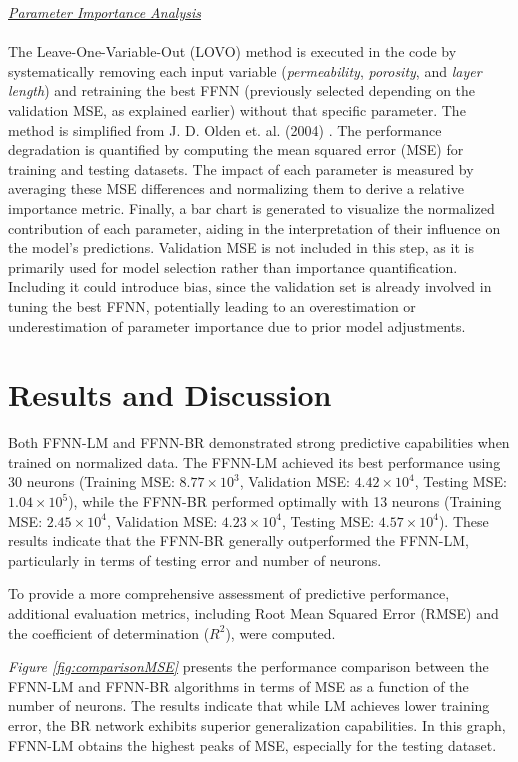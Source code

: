 \documentclass[10pt]{article}
\begin{document}
		\underline{\textit{Parameter Importance Analysis}} \\
		\\
		The Leave-One-Variable-Out (LOVO) method is executed in the code by systematically removing each input variable (\textit{permeability}, \textit{porosity}, and \textit{layer length}) and retraining the best FFNN (previously selected depending on the validation MSE, as explained earlier) without that specific parameter. The method is simplified from J. D. Olden et. al. (2004) \cite{olden2004}. The performance degradation is quantified by computing the mean squared error (MSE) for training and testing datasets. The impact of each parameter is measured by averaging these MSE differences and normalizing them to derive a relative importance metric. Finally, a bar chart is generated to visualize the normalized contribution of each parameter, aiding in the interpretation of their influence on the model's predictions. Validation MSE is not included in this step, as it is primarily used for model selection rather than importance quantification. Including it could introduce bias, since the validation set is already involved in tuning the best FFNN, potentially leading to an overestimation or underestimation of parameter importance due to prior model adjustments. 
	
	\section{Results and Discussion}
	
	Both FFNN-LM and FFNN-BR demonstrated strong predictive capabilities when trained on normalized data. The FFNN-LM achieved its best performance using 30 neurons (Training MSE: \(8.77 \times 10^3\), Validation MSE: \(4.42 \times 10^4\), Testing MSE: \(1.04 \times 10^5\)), while the FFNN-BR performed optimally with 13 neurons (Training MSE: \(2.45 \times 10^4\), Validation MSE: \(4.23 \times 10^4\), Testing MSE: \(4.57 \times 10^4\)). These results indicate that the FFNN-BR generally outperformed the FFNN-LM, particularly in terms of testing error and number of neurons.
	
	To provide a more comprehensive assessment of predictive performance, additional evaluation metrics, including Root Mean Squared Error (RMSE) and the coefficient of determination ($R^2$), were computed.
	
	\textit{Figure \ref{fig:comparisonMSE}} presents the performance comparison between the FFNN-LM and FFNN-BR algorithms in terms of MSE as a function of the number of neurons. The results indicate that while LM achieves lower training error, the BR network exhibits superior generalization capabilities. In this graph, FFNN-LM obtains the highest peaks of MSE, especially for the testing dataset.
	
\end{document}

